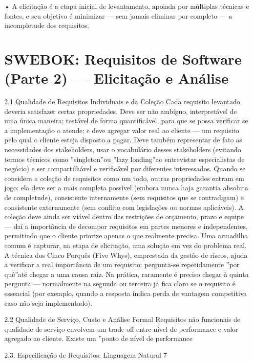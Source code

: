 • A elicitação é a etapa inicial de levantamento, apoiada por múltiplas técnicas e fontes, e seu objetivo é minimizar — sem jamais eliminar por completo — a incompletude dos requisitos.

\chapter{SWEBOK: Requisitos de Software (Parte 2) — Elicitação e Análise}

2.1 Qualidade de Requisitos Individuais e da Coleção Cada requisito levantado deveria satisfazer certas propriedades. Deve ser não ambíguo, interpretável de uma única maneira; testável de forma quantificável, para que se possa verificar se a implementação o atende; e deve agregar valor real ao cliente — um requisito pelo qual o cliente esteja disposto a pagar. Deve também representar de fato as necessidades dos stakeholders, usar o vocabulário desses stakeholders (evitando termos técnicos como ”singleton”ou ”lazy loading”ao entrevistar especialistas de negócio) e ser compartilhável e verificável por diferentes interessados. Quando se considera a coleção de requisitos como um todo, outras propriedades entram em jogo: ela deve ser a mais completa possível (embora nunca haja garantia absoluta de completude), consistente internamente (sem requisitos que se contradigam) e consistente externamente (sem conflito com legislações ou normas aplicáveis). A coleção deve ainda ser viável dentro das restrições de orçamento, prazo e equipe — daí a importância de decompor requisitos em partes menores e independentes, permitindo que o cliente priorize apenas o que realmente precisa. Uma armadilha comum é capturar, na etapa de elicitação, uma solução em vez do problema real. A técnica dos Cinco Porquês (Five Whys), emprestada da gestão de riscos, ajuda a verificar a real importância de um requisito: pergunta-se repetidamente ”por quê”até chegar a uma causa raiz. Na prática, raramente é preciso chegar à quinta pergunta — normalmente na segunda ou terceira já fica claro se o requisito é essencial (por exemplo, quando a resposta indica perda de vantagem competitiva caso não seja implementado).

2.2 Qualidade de Serviço, Custo e Análise Formal Requisitos não funcionais de qualidade de serviço envolvem um trade-off entre nível de performance e valor agregado ao cliente. Existe um ”ponto de nível de performance

2.3. Especificação de Requisitos: Linguagem Natural 7

